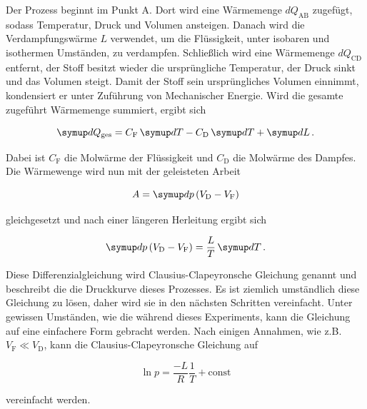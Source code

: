 Der Prozess beginnt im Punkt A.
Dort wird eine Wärmemenge $dQ_\text{AB}$ zugefügt, sodass Temperatur, Druck und Volumen ansteigen.
Danach wird die Verdampfungswärme $L$ verwendet, um die Flüssigkeit, unter isobaren und isothermen Umständen, zu verdampfen.
Schließlich wird eine Wärmemenge $dQ_\text{CD}$ entfernt, der Stoff besitzt wieder die ursprüngliche Temperatur, der Druck sinkt und das Volumen steigt.
Damit der Stoff sein ursprüngliches Volumen einnimmt, kondensiert er unter Zuführung von Mechanischer Energie.
Wird die gesamte zugeführt Wärmemenge summiert, ergibt sich

\begin{equation}
    \dif{Q_\text{ges}} = C_\text{F} \dif{T} - C_\text{D} \dif{T} + \dif{L}.
    \label{eq:waerme}
\end{equation}

Dabei ist $C_\text{F}$ die Molwärme der Flüssigkeit und $C_\text{D}$ die Molwärme des Dampfes.
Die Wärmewenge wird nun mit der geleisteten Arbeit

\begin{equation}
    A = \dif{p} \left(V_\text{D} - V_\text{F}\right)
    \label{eq:arbeit}
\end{equation}

gleichgesetzt und nach einer längeren Herleitung ergibt sich

\begin{equation}
    \dif{p} \left(V_\text{D} - V_\text{F}\right) = \frac{L}{T} \dif{T}.
    \label{eq:clapeyron}
\end{equation}

Diese Differenzialgleichung wird Clausius-Clapeyronsche Gleichung genannt und beschreibt die die Druckkurve dieses Prozesses.
Es ist ziemlich umständlich diese Gleichung zu lösen, daher wird sie in den nächsten Schritten vereinfacht.
Unter gewissen Umständen, wie die während dieses Experiments, kann die Gleichung auf eine einfachere Form gebracht werden.
Nach einigen Annahmen, wie z.B. $V_\text{F} \ll V_\text{D}$, kann die Clausius-Clapeyronsche Gleichung auf

\begin{equation}
    \ln p = \frac{-L}{R} \frac{1}{T} + \text{const}
    \label{eq:druck}
\end{equation}

vereinfacht werden.